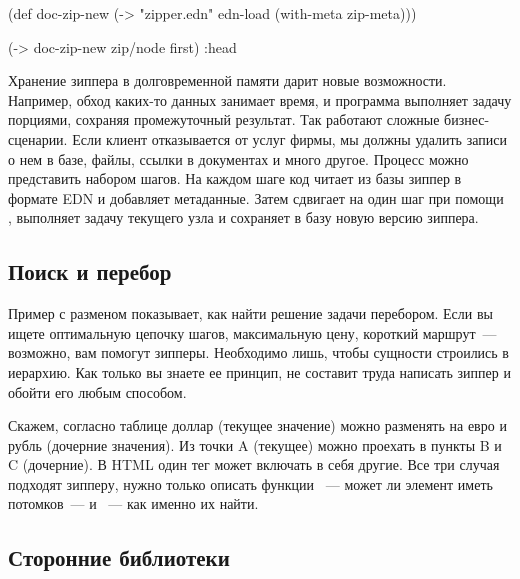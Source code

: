 \begin{english}
  \begin{clojure/lines}
(def doc-zip-new
  (-> "zipper.edn"
      edn-load
      (with-meta zip-meta)))

(-> doc-zip-new zip/node first)
:head
  \end{clojure/lines}
\end{english}

Хранение зиппера в долговременной памяти дарит новые воз\-мож\-нос\-ти. Например,
обход каких-то данных занимает время, и программа выполняет задачу порциями,
сохраняя промежуточный результат. Так работают сложные бизнес-сценарии. Если
клиент отказывается от услуг фирмы, мы должны удалить записи о нем в базе, файлы,
ссылки в документах и много другое. Процесс можно представить набором
шагов. На каждом шаге код читает из базы зиппер в формате EDN и добавляет
метаданные. Затем сдвигает на один шаг при помощи , выполняет
задачу текущего узла и сохраняет в базу новую версию зиппера.

\subsection{Поиск и перебор}


Пример с разменом показывает, как найти решение задачи перебором. Если вы ищете
оптимальную цепочку шагов, максимальную цену, короткий маршрут~--- возможно, вам
помогут зипперы. Необходимо лишь, чтобы сущности строились в иерархию. Как
только вы знаете ее принцип, не составит труда написать зиппер и обойти его
любым способом.

Скажем, согласно таблице доллар (текущее значение) можно разменять на евро и
рубль (дочерние значения). Из точки A (текущее) можно проехать в пункты B и C
(дочерние). В HTML один тег может включать в себя другие. Все три случая
подходят зипперу, нужно только описать функции ~--- может ли
элемент иметь потомков~--- и ~--- как именно их найти.

\subsection{Сторонние библиотеки}

\def\zippo{https://github.com/igrishaev/zippo}
\def\datazip{https://github.com/clojure/data.zip}


